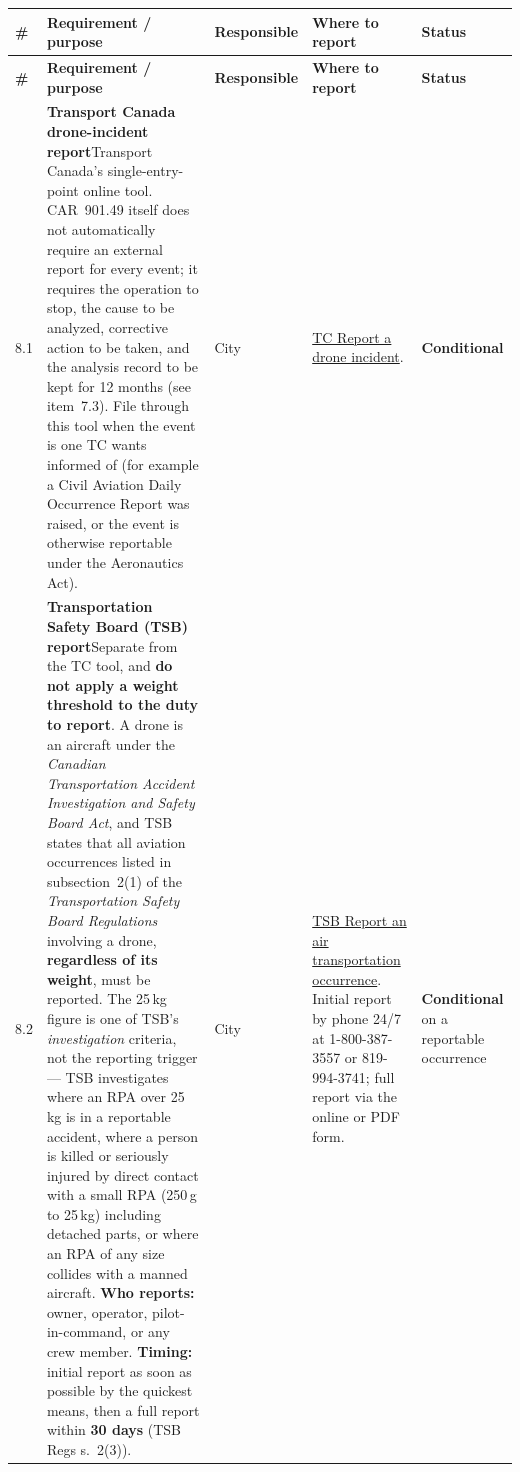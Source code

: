 \documentclass[11pt,letterpaper]{article}
\newcommand{\itemrule}{\arrayrulecolor{uavrule}\midrule\arrayrulecolor{black}}
\newcommand{\reqcell}[2]{\textbf{#1}\newline\small\color{uavgrey}#2}
\newcommand{\cond}{\textbf{\color{uavblue}Conditional}}
\begin{document}
\begin{longtable}{@{}L{0.28in} L{2.20in} L{0.85in} L{1.95in} L{0.85in}@{}}
\toprule
\color{uavblue}\bfseries\# &
\color{uavblue}\bfseries Requirement / purpose &
\color{uavblue}\bfseries Responsible &
\color{uavblue}\bfseries Where to report &
\color{uavblue}\bfseries Status \\
\midrule
\endfirsthead
\toprule
\color{uavblue}\bfseries\# &
\color{uavblue}\bfseries Requirement / purpose &
\color{uavblue}\bfseries Responsible &
\color{uavblue}\bfseries Where to report &
\color{uavblue}\bfseries Status \\
\midrule
\endhead

8.1 &
\reqcell{Transport Canada drone-incident report}{Transport Canada's single-entry-point online tool. CAR~901.49 itself does not automatically require an external report for every event; it requires the operation to stop, the cause to be analyzed, corrective action to be taken, and the analysis record to be kept for 12 months (see item~7.3). File through this tool when the event is one TC wants informed of (for example a Civil Aviation Daily Occurrence Report was raised, or the event is otherwise reportable under the Aeronautics Act).} &
City &
\href{https://tc.canada.ca/en/aviation/drone-safety/report-drone-incident}{TC Report a drone incident}. &
\cond{} \\ \itemrule

8.2 &
\reqcell{Transportation Safety Board (TSB) report}{Separate from the TC tool, and \textbf{do not apply a weight threshold to the duty to report}. A drone is an aircraft under the \emph{Canadian Transportation Accident Investigation and Safety Board Act}, and TSB states that all aviation occurrences listed in subsection~2(1) of the \emph{Transportation Safety Board Regulations} involving a drone, \textbf{regardless of its weight}, must be reported. The 25\,kg figure is one of TSB's \emph{investigation} criteria, not the reporting trigger --- TSB investigates where an RPA over 25\,kg is in a reportable accident, where a person is killed or seriously injured by direct contact with a small RPA (250\,g to 25\,kg) including detached parts, or where an RPA of any size collides with a manned aircraft. \textbf{Who reports:} owner, operator, pilot-in-command, or any crew member. \textbf{Timing:} initial report as soon as possible by the quickest means, then a full report within \textbf{30 days} (TSB Regs s.~2(3)).} &
City &
\href{https://www.tsb.gc.ca/eng/incidents-occurrence/aviation/index.html}{TSB Report an air transportation occurrence}. Initial report by phone 24/7 at 1-800-387-3557 or 819-994-3741; full report via the online or PDF form. &
\cond{} on a reportable occurrence \\

\end{longtable}
\end{document}
